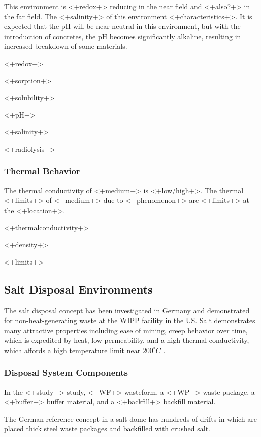 {This environment is <+redox+> reducing in the near field and <+also?+> in the 
far field. The <+salinity+> of this environment <+characteristics+>. It is 
expected that the pH will be near neutral in this environment, but with the 
introduction of concretes, the pH becomes significantly alkaline, resulting in 
increased breakdown of some materials. 

<+redox+>

<+sorption+>

<+solubility+>

<+pH+>

<+salinity+>

<+radiolysis+>

\subsubsection{Thermal Behavior}

The thermal conductivity of <+medium+> is <+low/high+>. The thermal  <+limits+> 
of <+medium+> due to <+phenomenon+> are <+limits+> at the <+location+>.


<+thermalconductivity+>

<+density+>

<+limits+>

\subsection{Salt Disposal Environments}

The salt disposal concept has been investigated in Germany and demonstrated for 
non-heat-generating waste at the \gls{WIPP} facility in the US. Salt 
demonstrates many attractive properties including ease of mining, creep behavior 
over time, which is expedited by heat, low permeability, and a high thermal 
conductivity, which affords a high temperature limit near $200^{\circ}C$ 
\cite{hardin_generic_2011} .



\subsubsection{Disposal System Components}
In the <+study+> study, <+WF+> wasteform, a <+WP+> waste package, a <+buffer+> 
buffer material, and a <+backfill+> backfill material.

The German reference concept in a salt dome has hundreds of drifts in which 
are placed thick steel waste packages and backfilled with crushed salt. 

}
